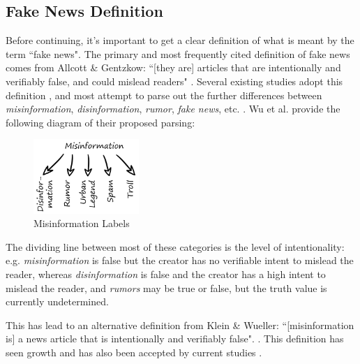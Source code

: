 \documentclass[preprint,review,12pt]{elsarticle}
\begin{document}
\subsection{Fake News Definition}
\label{Fake News Definition Section}
Before continuing, it's important to get a clear definition of what is meant by the term ``fake news". The primary and most frequently cited definition of fake news comes from Allcott \& Gentzkow: ``[they are] articles that are intentionally and verifiably false, and could mislead readers" \cite{allcott2017social}. Several existing studies adopt this definition \cite{conroy2015automatic,klein2017fake,rubin2015deception,rubin2017deception,mustafaraj2017fake,potthast2017stylometric}, and most attempt to parse out the further differences between \textit{misinformation}, \textit{disinformation}, \textit{rumor}, \textit{fake news}, etc. \cite{zimdars2020fake,  difonzo2007rumor,flynn2017nature,garrett2013undermining,wu2016mining}. Wu et al. provide the following diagram of their proposed parsing:
 \begin{figure}[htp]
    \centering
    \includegraphics[width=4cm]{misinformation graphic.png}
    \caption{Misinformation Labels \cite{wu2016mining}}
    \label{fig:misinformation graphic.png}
\end{figure}


The dividing line between most of these categories is the level of intentionality: e.g. \textit{misinformation} is false but the creator has no verifiable intent to mislead the reader, whereas \textit{disinformation} is false and the creator has a high intent to mislead the reader, and \textit{rumors} may be true or false, but the truth value is currently undetermined.

This has lead to an alternative definition from Klein \& Wueller: ``[misinformation is] a news article that is intentionally and verifiably false". \cite{klein2017fake}. This definition has seen growth and has also been accepted by current studies \cite{shu2017fake, liu2018early}.
\end{document}
